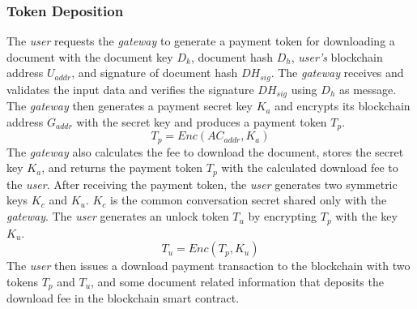 \subsubsection{Token Deposition}
The {\it user} requests the {\it gateway} to generate a payment token for downloading a document with the document key $D_k$, document hash $D_h$, {\it user's} blockchain address $U_{addr}$, and signature of document hash $DH_{sig}$. The {\it gateway} receives and validates the input data and verifies the signature $DH_{sig}$ using $D_{h}$ as message. The {\it gateway} then generates a payment secret key $K_a$ and encrypts its blockchain address $G_{addr}$ with the secret key and produces a payment token $T_{p}$. 
\begin{equation}
\label{eq-d-1}
T_p = Enc (AC_{addr}, K_a)
\end{equation}
The {\it gateway} also calculates the fee to download the document, stores the secret key $K_a$, and returns the payment token $T_p$ with the calculated download fee to the {\it user}.
After receiving the payment token, the {\it user} generates two symmetric keys $K_c$ and $K_u$. $K_c$ is the common conversation secret shared only with the {\it gateway}. The {\it user} generates an unlock token $T_u$ by encrypting $T_p$ with the key $K_u$.
\begin{equation}
\label{eq-d-2}
T_u = Enc (T_p, K_u)
\end{equation}
The {\it user} then issues a download payment transaction to the blockchain with two tokens $T_p$ and $T_u$, and some document related information that deposits the download fee in the blockchain smart contract.

